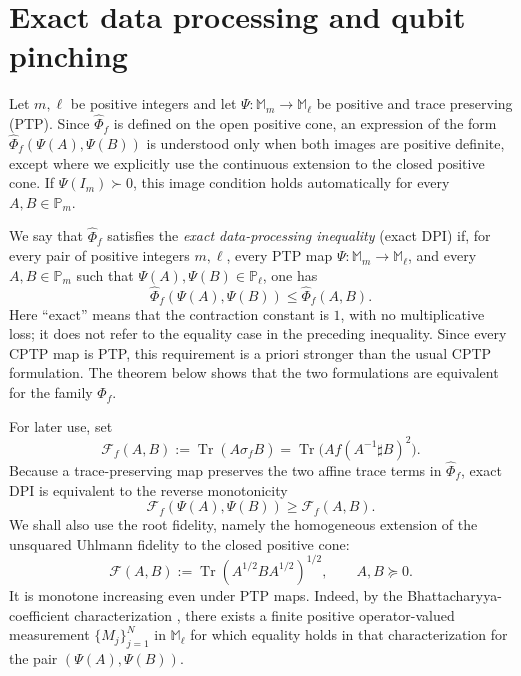 \documentclass[11pt]{amsart}
\theoremstyle{definition}
\theoremstyle{remark}
\newcommand{\Tr}{\operatorname{Tr}}
\newcommand{\altPhi}{\widehat{\Phi}}
\newcommand{\hatsigma}{\widehat{\sigma}}
\begin{document}
	\section{Exact data processing and qubit pinching}
	\label{sec:dpi}
	
Let $m,\ell$ be positive integers and let
	$\Psi:\mathbb M_m\to\mathbb M_\ell$ be positive and trace preserving
	(PTP).  Since $\altPhi_f$ is defined on the open positive cone, an
	expression of the form $\altPhi_f(\Psi(A),\Psi(B))$ is understood only
	when both images are positive definite, except where we explicitly use
	the continuous extension to the closed positive cone.  If
	$\Psi(I_m)\succ0$, this image condition holds automatically for every
	$A,B\in\mathbb P_m$.
	
	We say that $\altPhi_f$ satisfies the \emph{exact data-processing
		inequality} (exact DPI) if, for every pair of positive integers $m,\ell$,
	every PTP map $\Psi:\mathbb M_m\to\mathbb M_\ell$, and every
	$A,B\in\mathbb P_m$ such that
	$\Psi(A),\Psi(B)\in\mathbb P_\ell$, one has
	\[
	\altPhi_f(\Psi(A),\Psi(B))
	\le \altPhi_f(A,B).
	\]
	Here ``exact'' means that the contraction constant is $1$, with no
	multiplicative loss; it does not refer to the equality case in the
	preceding inequality.  Since every CPTP map is PTP, this requirement is
	a priori stronger than the usual CPTP formulation.  The theorem below
	shows that the two formulations are equivalent for the family
	$\altPhi_f$.

For later use, set
\[
\mathcal F_f(A,B)
:=\Tr(A\hatsigma_fB)
=\Tr\!\bigl(Af(A^{-1}\sharp B)^2\bigr).
\]
Because a trace-preserving map preserves the two affine trace terms in
$\altPhi_f$, exact DPI is equivalent to the reverse monotonicity
\begin{equation}\label{eq:fidelity-reverse-dpi}
	\mathcal F_f(\Psi(A),\Psi(B))
	\ge \mathcal F_f(A,B).
\end{equation}
We shall also use the root fidelity, namely the homogeneous extension of
the unsquared Uhlmann fidelity to the closed positive cone:
\[
\mathcal F(A,B)
:=\Tr\!\left(A^{1/2}BA^{1/2}\right)^{1/2},
\qquad A,B\succeq0.
\]
It is monotone increasing even under PTP maps.  Indeed, by the
Bhattacharyya-coefficient characterization
\cite[Theorem~3.24]{Watrous}, there exists a finite positive
operator-valued measurement $\{M_j\}_{j=1}^N$ in $\mathbb M_\ell$ for
which equality holds in that characterization for the pair
$(\Psi(A),\Psi(B))$.
\end{document}
